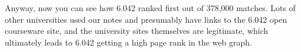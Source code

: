 Anyway, now you can see how 6.042 ranked first out of 378,000 matches.
Lots of other universities used our notes and presumably have links to the
6.042 open courseware site, and the university sites themselves are
legitimate, which ultimately leads to 6.042 getting a high page rank in
the web graph.

\begin{problems}

\classproblems
{}

\homeworkproblems
{}

\examproblems
{}

\end{problems}



\endinput
